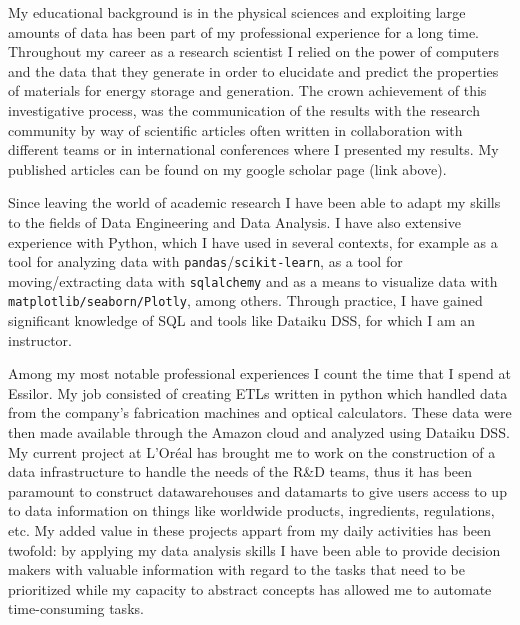 \documentclass[11pt, a4paper]{awesome-cv}
\begin{document}
\begin{cvletter}
My educational background is in the physical sciences and exploiting large amounts of data has been part of my professional experience for a long time. Throughout my career as a research scientist I relied on the power of computers and the data that they generate in order to elucidate and predict the properties of materials for energy storage and generation. The crown achievement of this investigative process, was the communication of the results with the research community by way of scientific articles often written in collaboration with different teams or in international conferences where I presented my results. My published articles can be found on my google scholar page (link above).

\begin{comment}
My role as a researcher consisted of implementing algorithms to model battery or solar cell materials, then carrying out simulations from which data could be gathered, transformed and ultimatley interpreted within the context of its physical/chemical meaning. The final aspect, and crown achievement of this investigative process, was the communication of the results with the research community by way of scientific articles often written in collaboration with different teams or in international conferences where I presented my results. My published articles can be found on my google scholar page (link above).
\end{comment}

Since leaving the world of academic research I have been able to adapt my skills to the fields of Data Engineering and Data Analysis. I have also extensive experience with Python, which I have used in several contexts, for example as a tool for analyzing data with \texttt{pandas}/\texttt{scikit-learn}, as a tool for moving/extracting data with \texttt{sqlalchemy} and as a means to visualize data with \texttt{matplotlib/seaborn/Plotly}, among others. Through practice, I have gained significant knowledge of SQL and tools like Dataiku DSS, for which I am an instructor.

Among my most notable professional experiences I count the time that I spend at Essilor. My job consisted of creating ETLs written in python which handled data from the company's fabrication machines and optical calculators. These data were then made available through the Amazon cloud and analyzed using Dataiku DSS. My current project at L'Oréal has brought me to work on the construction of a data infrastructure to handle the needs of the R\&D teams, thus it has been paramount to construct datawarehouses and datamarts to give users access to up to data information on things like worldwide products, ingredients, regulations, etc.  My added value in these projects appart from my daily activities has been twofold: by applying my data analysis skills I have been able to provide decision makers with valuable information with regard to the tasks that need to be prioritized while my capacity to abstract concepts has allowed me to automate time-consuming tasks.


\end{cvletter}
\end{document}

